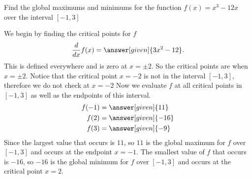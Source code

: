 \documentclass{ximera}
\begin{document}
\begin{example}
Find the global maximums and minimums for the function 
$f(x)=x^3-12x$ over the interval $[-1,3]$
\begin{explanation} 
We begin by finding the critical points for $f$
\[
\ddx f(x)=\answer[given]{3x^2-12}.
\] 
This is defined everywhere and is zero at $x=\pm 2$. So the critical
points are when $x=\pm 2$. Notice that the critical point $x=-2$ is not in the interval $[-1,3]$, therefore we do not check at $x=-2$
Now we evaluate $f$ at all critical points in $[-1,3]$ as well as the endpoints of this interval.
\begin{align*}
f(-1) &= \answer[given]{11} \\ 
f(2) &= \answer[given]{-16} \\ 
f(3) &= \answer[given]{-9} 
\end{align*}
Since the largest value that occurs is $11$, so $11$ is the global maximum for $f$ over $[-1,3]$ and occurs at the endpoint $x=-1$. 
The smallest value of $f$ that occurs is $-16$, so $-16$ is the global minimum for $f$ over $[-1,3]$ and occurs at the critical point $x=2$.
\end{explanation}
\end{example}
\end{document}
